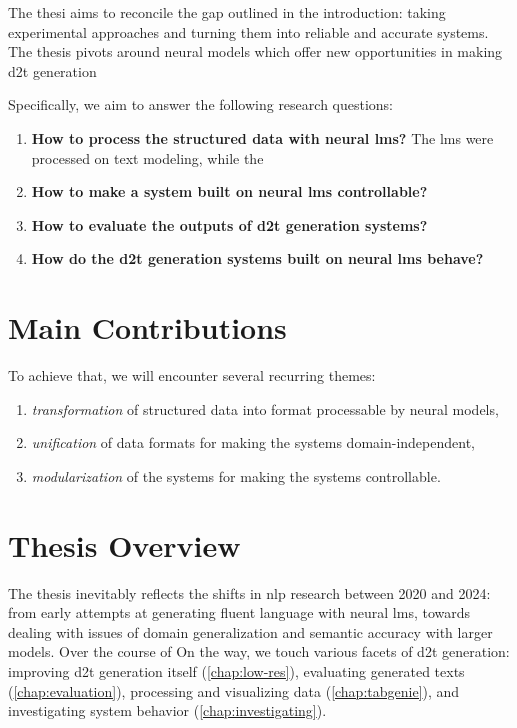 \documentclass[12pt,notitlepage,a4paper,openright]{report}
\begin{document}
The thesi aims to reconcile the gap outlined in the introduction: taking experimental approaches and turning them into reliable and accurate systems. The thesis pivots around neural models which offer new opportunities in making \ac{d2t} generation

Specifically, we aim to answer the following research questions:

\begin{enumerate}
  \item \textbf{How to process the structured data with neural \acp{lm}?} The \acp{lm} were processed on text modeling, while the
  \item \textbf{How to make a system built on neural \acp{lm} controllable?}
  \item \textbf{How to evaluate the outputs of \ac{d2t} generation systems?}
  \item \textbf{How do the \ac{d2t} generation systems built on neural \acp{lm} behave?}
\end{enumerate}



\section{Main Contributions}
\label{sec:contributions}


To achieve that, we will encounter several recurring themes:
\begin{enumerate}
  \item \textit{transformation} of structured data into format processable by neural models,
  \item \textit{unification} of data formats for making the systems domain-independent,
  \item \textit{modularization} of the systems for making the systems controllable.
\end{enumerate}



\section{Thesis Overview}
\label{sec:overview}


The thesis inevitably reflects the shifts in \ac{nlp} research between 2020 and 2024: from early attempts at generating fluent language with neural \acp{lm}, towards dealing with issues of domain generalization and semantic accuracy with larger models.
Over the course of
On the way, we touch various facets of \ac{d2t} generation: improving \ac{d2t} generation itself (\autoref{chap:low-res}), evaluating generated texts (\autoref{chap:evaluation}), processing and visualizing data (\autoref{chap:tabgenie}), and investigating system behavior (\autoref{chap:investigating}).
\end{document}
